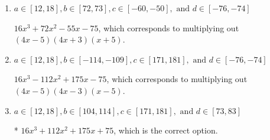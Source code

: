 \documentclass{extbook}[14pt]
\begin{document}
\begin{enumerate}
{\begin{enumerate}[label=\Alph*.]
$16x^{3} +112 x^{2} +175 x -75$, which corresponds to multiplying everything correctly except the constant term.
\item \( a \in [12, 18], b \in [72, 73], c \in [-60, -50], \text{ and } d \in [-76, -74] \)

$16x^{3} +72 x^{2} -55 x -75$, which corresponds to multiplying out $(4x -5)(4x + 3)(x + 5)$.
\item \( a \in [12, 18], b \in [-114, -109], c \in [171, 181], \text{ and } d \in [-76, -74] \)

$16x^{3} -112 x^{2} +175 x -75$, which corresponds to multiplying out $(4x -5)(4x -3)(x -5)$.
\item \( a \in [12, 18], b \in [104, 114], c \in [171, 181], \text{ and } d \in [73, 83] \)

* $16x^{3} +112 x^{2} +175 x + 75$, which is the correct option.
\end{enumerate}

}
\end{enumerate}
\end{document}
